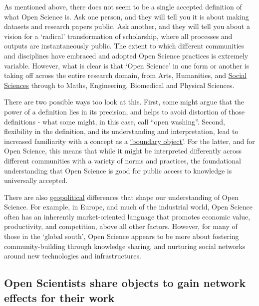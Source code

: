 \documentclass[]{book}
\begin{document}
As mentioned above, there does not seem to be a single accepted definition of what Open Science is. Ask one person, and they will tell you it is about making datasets and research papers public. Ask another, and they will tell you about a vision for a `radical' transformation of scholarship, where all processes and outputs are instantaneously public. The extent to which different communities and disciplines have embraced and adopted Open Science practices is extremely variable. However, what is clear is that `Open Science' in one form or another is taking off across the entire research domain, from Arts, Humanities, and \href{https://github.com/OpenScienceMOOC/Module-1-Open-Principles/blob/master/Reading\%20Material_Open\%20Principles/Miguel\%20et\%20al.\%2C\%202014.pdf}{Social Sciences} through to Maths, Engineering, Biomedical and Physical Sciences.

There are two possible ways too look at this. First, some might argue that the power of a definition lies in its precision, and helps to avoid distortion of those definitions - what some might, in this case, call ``open washing''. Second, flexibility in the definition, and its understanding and interpretation, lead to increased familiarity with a concept as a \href{https://journals.openedition.org/rfsic/3220}{`boundary object'}. For the latter, and for Open Science, this means that while it might be interpreted differently across different communities with a variety of norms and practices, the foundational understanding that Open Science is good for public access to knowledge is universally accepted.

There are also \href{https://medium.com/@denalbz/power-and-inequality-in-open-science-discourses-9d425b0c2b63}{geopolitical} differences that shape our understanding of Open Science. For example, in Europe, and much of the industrial world, Open Science often has an inherently market-oriented language that promotes economic value, productivity, and competition, above all other factors. However, for many of those in the `global south', Open Science appears to be more about fostering community-building through knowledge sharing, and nurturing social networks around new technologies and infrastructures.

\hypertarget{open-scientists-share-objects-to-gain-network-effects-for-their-work}{%
\subsection{Open Scientists share objects to gain network effects for their work }\label{open-scientists-share-objects-to-gain-network-effects-for-their-work}}
\end{document}
